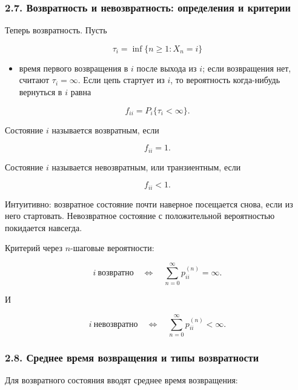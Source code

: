 \documentclass[
  11pt,
  a4paper,
]{article}
\providecommand{\tightlist}{%
  \setlength{\itemsep}{0pt}\setlength{\parskip}{0pt}}
\begin{document}
\subsubsection{2.7. Возвратность и невозвратность: определения и
критерии}\label{ux432ux43eux437ux432ux440ux430ux442ux43dux43eux441ux442ux44c-ux438-ux43dux435ux432ux43eux437ux432ux440ux430ux442ux43dux43eux441ux442ux44c-ux43eux43fux440ux435ux434ux435ux43bux435ux43dux438ux44f-ux438-ux43aux440ux438ux442ux435ux440ux438ux438}

Теперь возвратность. Пусть

\[
\tau_i=\inf\{n\ge1:X_n=i\}
\]

\begin{itemize}
\tightlist
\item
  время первого возвращения в \(i\) после выхода из \(i\); если
  возвращения нет, считают \(\tau_i=\infty\). Если цепь стартует из
  \(i\), то вероятность когда-нибудь вернуться в \(i\) равна
\end{itemize}

\[
f_{ii}=P_i\{\tau_i<\infty\}.
\]

Состояние \(i\) называется возвратным, если

\[
f_{ii}=1.
\]

Состояние \(i\) называется невозвратным, или транзиентным, если

\[
f_{ii}<1.
\]

Интуитивно: возвратное состояние почти наверное посещается снова, если
из него стартовать. Невозвратное состояние с положительной вероятностью
покидается навсегда.

Критерий через \(n\)-шаговые вероятности:

\[
i\ \text{возвратно}
\quad\Longleftrightarrow\quad
\sum_{n=0}^{\infty}p_{ii}^{(n)}=\infty.
\]

И

\[
i\ \text{невозвратно}
\quad\Longleftrightarrow\quad
\sum_{n=0}^{\infty}p_{ii}^{(n)}<\infty.
\]

\subsubsection{2.8. Среднее время возвращения и типы
возвратности}\label{ux441ux440ux435ux434ux43dux435ux435-ux432ux440ux435ux43cux44f-ux432ux43eux437ux432ux440ux430ux449ux435ux43dux438ux44f-ux438-ux442ux438ux43fux44b-ux432ux43eux437ux432ux440ux430ux442ux43dux43eux441ux442ux438}

Для возвратного состояния вводят среднее время возвращения:
\end{document}
